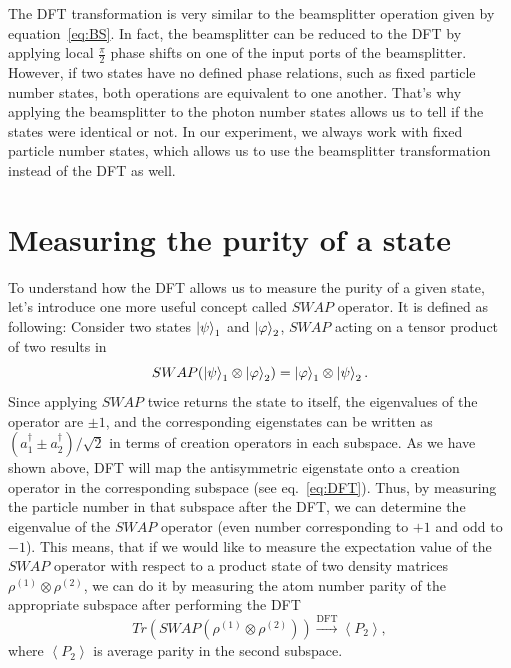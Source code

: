 The DFT transformation is very similar to the beamsplitter operation given by equation~\ref{eq:BS}. In fact, the beamsplitter can be reduced to the DFT by applying local $\frac{\pi}{2}$ phase shifts on one of the input ports of the beamsplitter. However, if two states have no defined phase relations, such as fixed particle number states, both operations are equivalent to one another. That's why applying the beamsplitter to the photon number states allows us to tell if the states were identical or not. In our experiment, we always work with fixed particle number states, which allows us to use the beamsplitter transformation instead of the DFT as well. 

\section{Measuring the purity of a state}
To understand how the DFT allows us to measure the purity of a given state, let's introduce one more useful concept called $SWAP$ operator. It is defined as following: Consider two states $\left|\psi\right\rangle_1$ and $\left|\varphi\right\rangle_2$, $SWAP$ acting on a tensor product of two results in 
\begin{equation}
SWAP(\left|\psi\right\rangle_1 \otimes \left|\varphi\right\rangle_2) = \left|\varphi\right\rangle_1 \otimes \left|\psi\right\rangle_2.
\end{equation}
Since applying $SWAP$ twice returns the state to itself, the eigenvalues of the operator are $\pm 1$, and the corresponding eigenstates can be written as $(a^{\dagger}_1 \pm a^{\dagger}_2)/\sqrt{2}$ in terms of creation operators in each subspace. As we have shown above, DFT will map the antisymmetric eigenstate onto a creation operator in the corresponding subspace (see eq.~\ref{eq:DFT}). Thus, by measuring the particle number in that subspace after the DFT, we can determine the eigenvalue of the $SWAP$ operator (even number corresponding to $+1$ and odd to $-1$). This means, that if we would like to measure the expectation value of the $SWAP$ operator with respect to a product state of two density matrices $\rho^{(1)} \otimes \rho^{(2)}$, we can do it by measuring the atom number parity of the appropriate subspace after performing the DFT
\begin{equation}
Tr(SWAP(\rho^{(1)} \otimes \rho^{(2)})) \xrightarrow[]{\text{DFT}} \left< P_2 \right>,
\end{equation}
where $\left< P_2 \right>$ is average parity in the second subspace.

